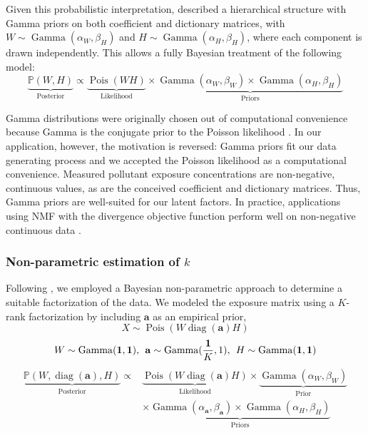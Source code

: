 Given this probabilistic interpretation, \citet{cemgil2008bayesian} described a hierarchical structure with Gamma priors on both coefficient and dictionary matrices, with ${W \sim \operatorname{Gamma}(\alpha_{W}, \beta_{H})}$ and ${H \sim \operatorname{Gamma}(\alpha_{H}, \beta_{H})}$, where each component is drawn independently. This allows a fully Bayesian treatment of the following model:
\begin{equation}
    \underbrace{\mathbb{P}(W, H)}_{\text{Posterior}}
    \propto \underbrace{\operatorname{Pois}(W H)}_{\text{Likelihood}}
    \times \underbrace{\operatorname{Gamma}(\alpha_W, \beta_W) 
    \times \operatorname{Gamma}(\alpha_H, \beta_H)}_{\text{Priors}}
\end{equation} 

Gamma distributions were originally chosen out of computational convenience because Gamma is the conjugate prior to the Poisson likelihood \citep{cemgil2008bayesian}. In our application, however, the motivation is reversed: Gamma priors fit our data generating process and we accepted the Poisson likelihood as a computational convenience. Measured pollutant exposure concentrations are non-negative, continuous values, as are the conceived coefficient and dictionary matrices. Thus, Gamma priors are well-suited for our latent factors. In practice, applications using NMF with the divergence objective function perform well on non-negative continuous data \citep{brunet2004metagenes, fevotte2009nonnegative}.

\subsubsection{Non-parametric estimation of $k$}
\label{methods_k}
Following \citet{holtzman2018machine}, we employed a Bayesian non-parametric approach to determine a suitable factorization of the data. We modeled the exposure matrix using a $K$-rank factorization by including $\mathbf{a}$ as an empirical prior,
\begin{equation*}
{X \sim \operatorname{Pois}\left(W \operatorname{diag}(\mathbf{a}) H\right)}
\end{equation*}
\vspace{-5ex}
\begin{equation*}
{W \sim \operatorname{Gamma}(\mathbf{1}, \mathbf{1})}, \hspace{1ex}
{\mathbf{a} \sim \operatorname{Gamma}(\frac{\mathbf{1}}{K}, 1)}, \hspace{1ex} 
{H \sim \operatorname{Gamma}(\mathbf{1}, \mathbf{1})}
\end{equation*}
\vspace{-5ex}
\begin{align}
    \underbrace{\mathbb{P}(W, \operatorname{diag}(\mathbf{a}), H)}_{\text{Posterior}}
    \propto & \underbrace{\operatorname{Pois}(W\operatorname{diag}(\mathbf{a})H)}_{\text{Likelihood}}
    \times \underbrace{\operatorname{Gamma}(\alpha_W, \beta_W)}_{\text{Prior}} \\
    & \times \underbrace{\operatorname{Gamma}(\alpha_\mathbf{a}, \beta_\mathbf{a}) 
    \times \operatorname{Gamma}(\alpha_H, \beta_H)}_{\text{Priors}} \nonumber
\end{align} 

